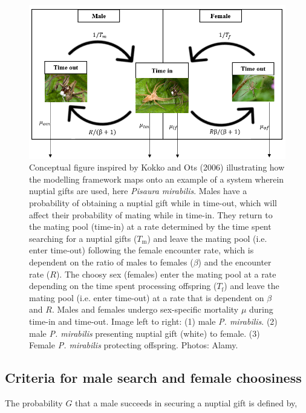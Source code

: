 \documentclass[
]{article}
\begin{document}
\begin{figure}
\includegraphics[width=1\linewidth]{inst/img/conceptual_figure} \caption{Conceptual figure inspired by Kokko and Ots (2006) illustrating how the modelling framework maps onto an example of a system wherein nuptial gifts are used, here \textit{Pisaura mirabilis}. Males have a probability of obtaining a nuptial gift while in time-out, which will affect their probability of mating while in time-in. They return to the mating pool (time-in) at a rate determined by the time spent searching for a nuptial gifts ($T_{\mathrm{m}}$) and leave the mating pool (i.e. enter time-out) following the female encounter rate, which is dependent on the ratio of males to females ($\beta$) and the encounter rate ($R$). The choosy sex (females) enter the mating pool at a rate depending on the time spent processing offspring ($T_{\mathrm{f}}$) and leave the mating pool (i.e. enter time-out) at a rate that is dependent on $\beta$ and $R$. Males and females undergo sex-specific mortality $\mu$ during time-in and time-out. Image left to right: (1) male \textit{P. mirabilis}. (2) male \textit{P. mirabilis} presenting nuptial gift (white) to female. (3) Female \textit{P. mirabilis} protecting offspring. Photos: Alamy.}\label{fig:unnamed-chunk-2}
\end{figure}

\hypertarget{criteria-for-male-search-and-female-choosiness}{%
\subsection{Criteria for male search and female
choosiness}\label{criteria-for-male-search-and-female-choosiness}}

The probability \(G\) that a male succeeds in securing a nuptial gift is
defined by,
\end{document}

